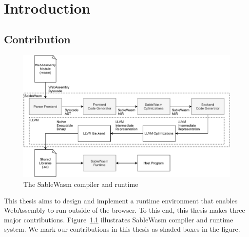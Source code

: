 \chapter{Introduction}


\section{Contribution}

\begin{figure}
    \centering
    \includegraphics[width=\textwidth]{Images/design}
    \caption{The SableWasm compiler and runtime}
    \label{fig:design}
\end{figure}

This thesis aims to design and implement a runtime environment that enables
WebAssembly to run outside of the browser. To this end, this thesis makes three
major contributions. Figure~\ref{fig:design} illustrates SableWasm compiler and
runtime system. We mark our contributions in this thesis as shaded boxes in the
figure.

